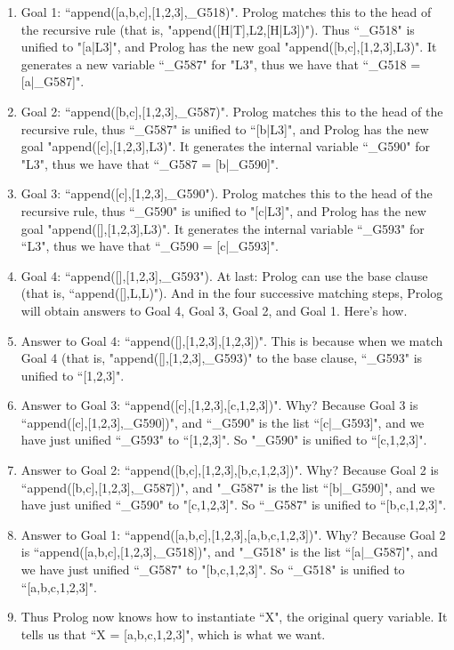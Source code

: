 \begin{enumerate}

\item{}Goal 1: ``append([a,b,c],[1,2,3],\_G518)".  Prolog
matches this to the head of the recursive rule (that is,
"append([H|T],L2,[H|L3])").  Thus ``\_G518" is unified to
"[a|L3]", and Prolog has the new goal
"append([b,c],[1,2,3],L3)".
It generates a new variable ``\_G587" for
"L3", thus we have that ``\_G518 = [a|\_G587]".

\item{}Goal 2: ``append([b,c],[1,2,3],\_G587)".  Prolog matches
this to the head of the recursive rule, thus ``\_G587" is unified
to ``[b|L3]", and Prolog has the new goal
"append([c],[1,2,3],L3)".
It generates the internal variable ``\_G590" for
"L3", thus we have that ``\_G587 = [b|\_G590]".

\item{}Goal 3: ``append([c],[1,2,3],\_G590").  Prolog matches this
to the head of the recursive rule, thus ``\_G590" is unified  to
"[c|L3]", and Prolog has the new goal
"append([],[1,2,3],L3)".
It generates the internal variable ``\_G593" for ``L3",
thus we have that ``\_G590 = [c|\_G593]".

\item{}Goal 4: ``append([],[1,2,3],\_G593").  At last: Prolog
can use the base clause (that is, ``append([],L,L)").  And in the
four successive matching steps, Prolog will obtain answers to Goal 4,
Goal 3, Goal 2, and Goal 1. Here's how.

\item{}Answer to Goal 4: ``append([],[1,2,3],[1,2,3])". This
is because when we match Goal 4 (that is,
"append([],[1,2,3],\_G593)" to the base clause, ``\_G593" is
unified to ``[1,2,3]".

\item{}Answer to Goal 3: ``append([c],[1,2,3],[c,1,2,3])".  Why?
Because Goal 3 is ``append([c],[1,2,3],\_G590])", and ``\_G590" is the
list ``[c|\_G593]", and we have just unified ``\_G593" to ``[1,2,3]". So
"\_G590" is unified to ``[c,1,2,3]".

\item{}Answer to Goal 2: ``append([b,c],[1,2,3],[b,c,1,2,3])".
Why? Because Goal 2 is ``append([b,c],[1,2,3],\_G587])", and
"\_G587" is the list  ``[b|\_G590]", and we have just unified ``\_G590" to
"[c,1,2,3]". So ``\_G587" is unified to ``[b,c,1,2,3]".

\item{}Answer to Goal 1: ``append([a,b,c],[1,2,3],[a,b,c,1,2,3])".
Why? Because Goal 2 is ``append([a,b,c],[1,2,3],\_G518])",  and
"\_G518" is the list ``[a|\_G587]", and we have just unified ``\_G587" to
"[b,c,1,2,3]". So ``\_G518" is unified to ``[a,b,c,1,2,3]".

\item{}Thus Prolog now knows how to instantiate ``X", the original
query variable.  It tells us that ``X = [a,b,c,1,2,3]", which
is what we want.
\end{enumerate}


